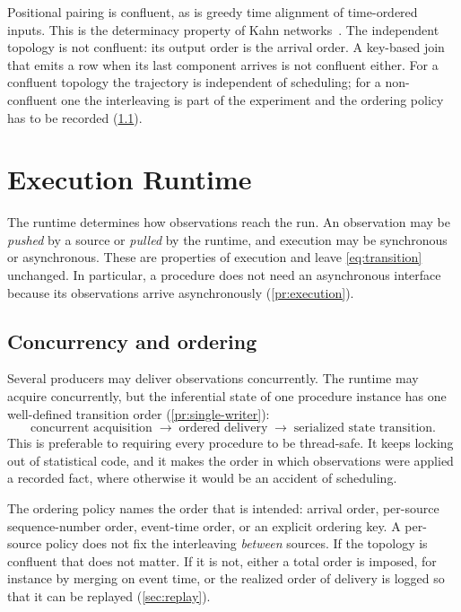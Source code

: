 \documentclass[11pt,a4paper]{article}
\theoremstyle{definition}
\theoremstyle{remark}
\begin{document}
Positional pairing is confluent, as is greedy time alignment of
time-ordered inputs. This is the determinacy property of Kahn
networks~\cite{kahn1974}. The independent topology is not confluent: its
output order is the arrival order. A key-based join that emits a row
when its last component arrives is not confluent either. For a
confluent topology the trajectory is independent of scheduling; for a
non-confluent one the interleaving is part of the experiment and the
ordering policy has to be recorded (\cref{sec:ordering}).

\section{Execution Runtime}
\label{sec:runtime}

The runtime determines how observations reach the run. An observation
may be \emph{pushed} by a source or \emph{pulled} by the runtime, and
execution may be synchronous or asynchronous. These are properties of
execution and leave \eqref{eq:transition} unchanged. In particular, a
procedure does not need an asynchronous interface because its
observations arrive asynchronously (\cref{pr:execution}).

\subsection{Concurrency and ordering}
\label{sec:ordering}

Several producers may deliver observations concurrently. The runtime may
acquire concurrently, but the inferential state of one procedure
instance has one well-defined transition order
(\cref{pr:single-writer}):
\[
\text{concurrent acquisition}
\;\longrightarrow\;
\text{ordered delivery}
\;\longrightarrow\;
\text{serialized state transition}.
\]
This is preferable to requiring every procedure to be thread-safe. It
keeps locking out of statistical code, and it makes the order in which
observations were applied a recorded fact, where otherwise it would be
an accident of scheduling.

The ordering policy names the order that is intended: arrival order,
per-source sequence-number order, event-time order, or an explicit
ordering key. A per-source policy does not fix the interleaving
\emph{between} sources. If the topology is confluent that does not
matter. If it is not, either a total order is imposed, for instance by
merging on event time, or the realized order of delivery is logged so
that it can be replayed (\cref{sec:replay}).
\end{document}
